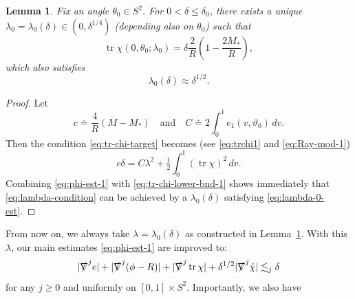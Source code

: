 \documentclass[10pt]{article}
\numberwithin{equation}{section}
\theoremstyle{plain}
\newtheorem{lem}{Lemma}[section]
\theoremstyle{definition}
\newcommand{\les}{\lesssim}
\newcommand{\tr}{\operatorname{tr}}
\begin{document}
\begin{lem}\label{lem:construction-of-lambda} Fix an angle $\theta_0 \in S^2$.
For $0<\delta\leq \delta_0$, there exists a unique $\lambda_0=\lambda_0(\delta)\in (0,\delta^{1/4})$ (depending also on $\theta_0$) such that 
\begin{equation}
    \tr\chi(0,\theta_0;\lambda_0) = \delta\frac{2}{R}\left(1-\frac{2M_*}{R}\right),\label{eq:tr-chi-target}
\end{equation}
which also satisfies 
\begin{equation}
    \lambda_0(\delta) \approx \delta^{1/2}.\label{eq:lambda-0-est}
\end{equation}
\end{lem}
\begin{proof}
Let 
\begin{equation}
     c\doteq \frac{4}{R}(M-M_*)\quad\text{and}\quad
    C\doteq 2\int_0^1 e_1(v,\vartheta_0)\,dv. \nonumber
\end{equation}
Then the condition \eqref{eq:tr-chi-target} becomes (see \eqref{eq:trchi1}  and \eqref{eq:Ray-mod-1})
\begin{equation}
    c\delta = C\lambda^2 +\tfrac 12 \int_0^1(\tr\chi)^2\,dv.\label{eq:lambda-condition}
\end{equation}
Combining \eqref{eq:phi-est-1} with \eqref{eq:tr-chi-lower-bnd-1} shows immediately that \eqref{eq:lambda-condition} can be achieved by a $\lambda_0(\delta)$ satisfying \eqref{eq:lambda-0-est}.
\end{proof}

From now on, we always take $\lambda = \lambda_0(\delta)$ as constructed in Lemma~\ref{lem:construction-of-lambda}.  
With this $\lambda$, our main estimates \eqref{eq:phi-est-1} are improved to:
\begin{equation}
    |\slashed \nabla^j e|+ |\slashed\nabla^j(\phi-R)|+|\slashed\nabla^j \tr\chi| + \delta^{1/2}|\slashed\nabla^j \hat\chi| \les_j \delta \label{eq:improved}
\end{equation}
for any $j\ge 0$ and uniformly on $[0,1]\times S^2$. Importantly, we also have 
\end{document}
